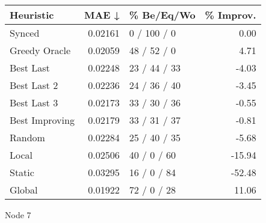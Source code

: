 \begin{tabular}{lrlr}
\toprule
\textbf{Heuristic} & \textbf{MAE ↓} & \textbf{\% Be/Eq/Wo} & \textbf{\% Improv.} \\
\midrule
            Synced &        0.02161 &          0 / 100 / 0 &                0.00 \\
     Greedy Oracle &        0.02059 &          48 / 52 / 0 &                4.71 \\
         Best Last &        0.02248 &         23 / 44 / 33 &               -4.03 \\
       Best Last 2 &        0.02236 &         24 / 36 / 40 &               -3.45 \\
       Best Last 3 &        0.02173 &         33 / 30 / 36 &               -0.55 \\
    Best Improving &        0.02179 &         33 / 31 / 37 &               -0.81 \\
            Random &        0.02284 &         25 / 40 / 35 &               -5.68 \\
             Local &        0.02506 &          40 / 0 / 60 &              -15.94 \\
            Static &        0.03295 &          16 / 0 / 84 &              -52.48 \\
            Global &        0.01922 &          72 / 0 / 28 &               11.06 \\
\bottomrule
\end{tabular}
\caption{Node 7}
\label{tab:non_lr05_le2_bs2_7}
